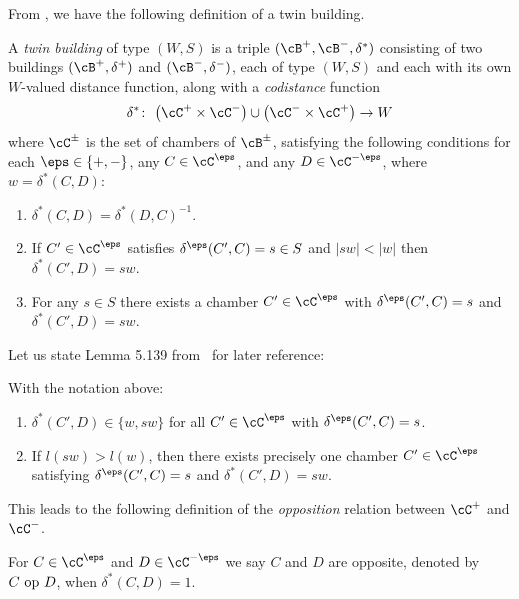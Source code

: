 From \cite[Definition 5.133]{AbramenkoBrown08}, we have the following definition of a twin building.
\begin{Definition}\label{definition:Twin_Building}
A {\em twin building} of type $(W,S)$ is a triple $(\cB^+, \cB^-, \delta^*)$ consisting of two buildings $(\cB^+, \delta^+)$ and $(\cB^-, \delta^-)$, each of type $(W,S)$ and each with its own $W$-valued distance function, along with a {\it codistance} function
\[\delta^* \colon \ \big(\cC^+ \times\cC^-\big) \cup \big(\cC^- \times\cC^+\big) \to W\]
where $\cC^\pm$ is the set of chambers of $\cB^\pm$, satisfying the following conditions for each $\eps\in\{+,-\}$, any $C\in\cC^\eps$,
and any $D\in\cC^{-\eps}$, where $w = \delta^*(C,D)$:
\begin{enumerate}\itemsep=0pt
 \item[(Tw1)] $\delta^*(C,D) = \delta^*(D,C)^{-1}$.
 \item[(Tw2)] If $C'\in\cC^\eps$ satisfies $\delta^\eps(C',C) = s\in S$ and $|sw| < |w|$ then $\delta^*(C',D) = sw$.
 \item[(Tw3)] For any $s\in S$ there exists a chamber $C'\in\cC^\eps$ with $\delta^\eps(C',C) = s$ and $\delta^*(C',D) = sw$.
\end{enumerate}
\end{Definition}

Let us state Lemma 5.139 from~\cite{AbramenkoBrown08} for later reference:

\begin{Lemma}\label{lemma:longer_element_chamber_unique}
With the notation above:
\begin{enumerate}\itemsep=0pt
\item[$1.$] $\delta^*(C',D) \in \{w, sw\}$ for all $C'\in\cC^\eps$ with $\delta^\eps(C',C) = s$.
\item[$2.$] If $l(sw) > l(w)$, then there exists precisely one chamber $C'\in\cC^\eps$ satisfying $\delta^\eps(C',C) = s$ and $\delta^*(C',D) = sw$.
\end{enumerate}
\end{Lemma}

This leads to the following definition of the {\it opposition} relation between $\cC^+$ and $\cC^-$.
\begin{Definition}\label{definition:Opposition_Relation}
For $C\in\cC^\eps$ and $D\in\cC^{-\eps}$ we say $C$ and $D$ are opposite, denoted by $C\ {\rm op}\ D$, when $\delta^*(C,D) = 1$.
\end{Definition}

